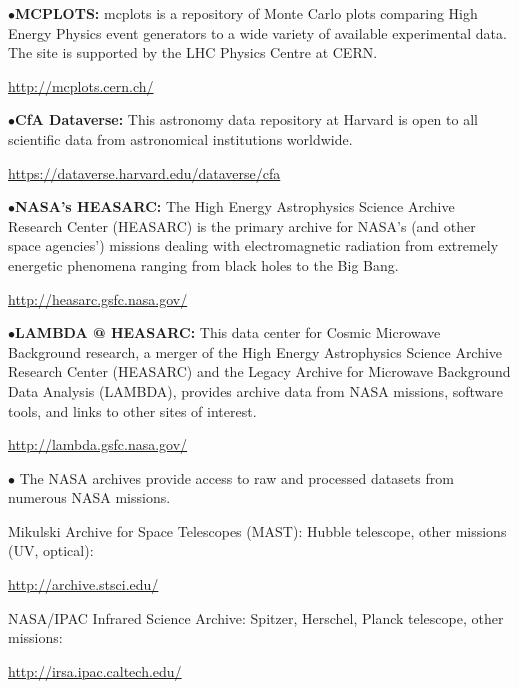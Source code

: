 \medskip

\item{$\bullet$}{\bf MCPLOTS:} 
mcplots is a repository of Monte Carlo plots comparing High Energy Physics event generators to a wide variety of available experimental data. The site is supported by the LHC Physics Centre at CERN.
	\item{}\qquad\url{http://mcplots.cern.ch/}

\medskip



\item{$\bullet$}{\bf CfA Dataverse:} 
This astronomy data repository at Harvard is open to all scientific data from astronomical institutions worldwide.
	\item{}\qquad\url{https://dataverse.harvard.edu/dataverse/cfa} 


\medskip

\item{$\bullet$}{\bf NASA's HEASARC:} 
The High Energy Astrophysics Science Archive Research Center (HEASARC) is the primary archive for NASA's (and other space agencies') missions dealing with electromagnetic radiation from extremely energetic phenomena ranging from black holes to the Big Bang.
	\item{}\qquad\url{http://heasarc.gsfc.nasa.gov/} 

\medskip

\item{$\bullet$}{\bf LAMBDA @ HEASARC:} 
This data center for Cosmic Microwave Background research, a merger of the High Energy Astrophysics Science Archive Research Center (HEASARC) and the Legacy Archive for Microwave Background Data Analysis (LAMBDA), provides archive data from NASA missions, software tools, and links to other sites of interest.
	\item{}\qquad\url{http://lambda.gsfc.nasa.gov/}

\medskip

\item{$\bullet$}
The NASA archives provide access to raw and processed datasets from numerous NASA missions. 
\item{}
Mikulski Archive for Space Telescopes (MAST): Hubble telescope, other missions (UV, optical):
	\item{}\qquad\url{http://archive.stsci.edu/} 
\item{}
NASA/IPAC Infrared Science Archive: Spitzer, Herschel, Planck telescope, other missions: \item{}\qquad\url{http://irsa.ipac.caltech.edu/}

